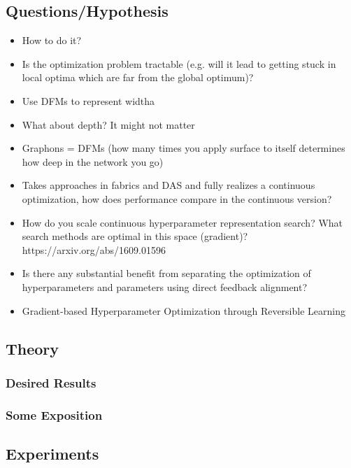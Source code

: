 \documentclass[12pt]{article}
\begin{document}



\subsection{Questions/Hypothesis}
\begin{itemize}
\item How to do it?
\item Is the optimization problem tractable (e.g. will it lead to getting stuck in local optima which are far from the global optimum)?
\item Use DFMs to represent widtha
\item What about depth? It might not matter
\item Graphons = DFMs (how many times you apply surface to itself determines how deep in the network you go)
\item Takes approaches in fabrics and DAS and fully realizes a continuous optimization, how does performance compare in the continuous version?
\item How do you scale continuous hyperparameter representation search? What search methods are optimal in this space (gradient)?  https://arxiv.org/abs/1609.01596 
\item Is there any substantial benefit from separating the optimization of hyperparameters and parameters using direct feedback alignment?
\item Gradient-based Hyperparameter Optimization through Reversible Learning
\end{itemize}
\subsection{Theory}

\subsubsection{Desired Results}

\subsubsection{Some Exposition}

\subsection{Experiments}
\end{document}

